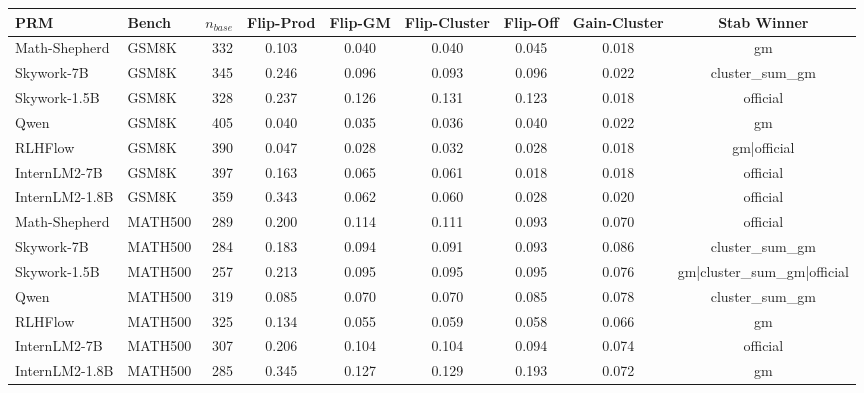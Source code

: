 \begin{tabular}{llrcccccc}
\toprule
PRM & Bench & $n_{base}$ & Flip-Prod & Flip-GM & Flip-Cluster & Flip-Off & Gain-Cluster & Stab Winner \\
\midrule
Math-Shepherd & GSM8K & 332 & 0.103 & 0.040 & 0.040 & 0.045 & 0.018 & gm \\
Skywork-7B & GSM8K & 345 & 0.246 & 0.096 & 0.093 & 0.096 & 0.022 & cluster\_sum\_gm \\
Skywork-1.5B & GSM8K & 328 & 0.237 & 0.126 & 0.131 & 0.123 & 0.018 & official \\
Qwen & GSM8K & 405 & 0.040 & 0.035 & 0.036 & 0.040 & 0.022 & gm \\
RLHFlow & GSM8K & 390 & 0.047 & 0.028 & 0.032 & 0.028 & 0.018 & gm|official \\
InternLM2-7B & GSM8K & 397 & 0.163 & 0.065 & 0.061 & 0.018 & 0.018 & official \\
InternLM2-1.8B & GSM8K & 359 & 0.343 & 0.062 & 0.060 & 0.028 & 0.020 & official \\
Math-Shepherd & MATH500 & 289 & 0.200 & 0.114 & 0.111 & 0.093 & 0.070 & official \\
Skywork-7B & MATH500 & 284 & 0.183 & 0.094 & 0.091 & 0.093 & 0.086 & cluster\_sum\_gm \\
Skywork-1.5B & MATH500 & 257 & 0.213 & 0.095 & 0.095 & 0.095 & 0.076 & gm|cluster\_sum\_gm|official \\
Qwen & MATH500 & 319 & 0.085 & 0.070 & 0.070 & 0.085 & 0.078 & cluster\_sum\_gm \\
RLHFlow & MATH500 & 325 & 0.134 & 0.055 & 0.059 & 0.058 & 0.066 & gm \\
InternLM2-7B & MATH500 & 307 & 0.206 & 0.104 & 0.104 & 0.094 & 0.074 & official \\
InternLM2-1.8B & MATH500 & 285 & 0.345 & 0.127 & 0.129 & 0.193 & 0.072 & gm \\
\bottomrule
\end{tabular}
